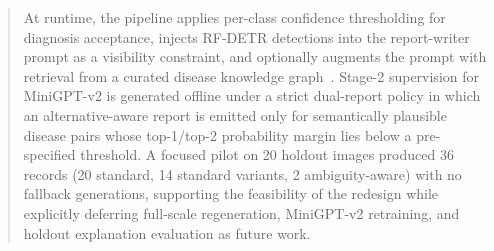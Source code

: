 \documentclass[11pt]{article}
\begin{document}
\begin{abstract}
At runtime, the pipeline applies per-class confidence thresholding for diagnosis acceptance, injects RF-DETR detections into the report-writer prompt as a visibility constraint, and optionally augments the prompt with retrieval from a curated disease knowledge graph~\citep{lewis2020rag}. Stage-2 supervision for MiniGPT-v2 is generated offline under a strict dual-report policy in which an alternative-aware report is emitted only for semantically plausible disease pairs whose top-1/top-2 probability margin lies below a pre-specified threshold. A focused pilot on 20 holdout images produced 36 records (20 standard, 14 standard variants, 2 ambiguity-aware) with no fallback generations, supporting the feasibility of the redesign while explicitly deferring full-scale regeneration, MiniGPT-v2 retraining, and holdout explanation evaluation as future work.
\end{abstract}












\end{document}
